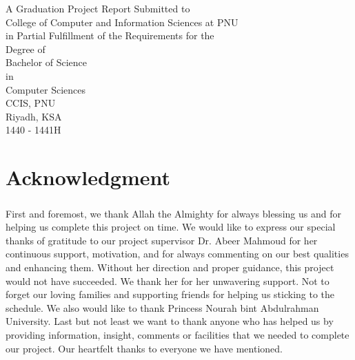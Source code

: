 \documentclass[12pt, oneside, a4paper]{book}
\begin{document}
\begin{titlepage}
\begin{center}
			\vfill \normalsize
			A Graduation Project Report Submitted to \\
			College of Computer and Information Sciences at PNU \\
			in Partial Fulfillment of the Requirements for the \\
			Degree of \\
			Bachelor of Science \\
			in \\
			Computer Sciences \\[5ex]
			CCIS, PNU \\
			Riyadh, KSA \\
			1440 - 1441H \\
		\end{center}
	\end{titlepage}
	\newpage

	\chapter*{Acknowledgment}
	\label{sec:ack}
	\paragraph{} First and foremost, we thank Allah the Almighty for always blessing us and for helping us complete this project on time. We would like to express our special thanks of gratitude to our project supervisor Dr. Abeer Mahmoud for her continuous support, motivation, and for always commenting on our best qualities and enhancing them. Without her direction and proper guidance, this project would not have succeeded. We thank her for her unwavering support. Not to forget our loving families and supporting friends for helping us sticking to the schedule. We also would like to thank Princess Nourah bint Abdulrahman University. Last but not least we want to thank anyone who has helped us by providing information, insight, comments or facilities that we needed to complete our project. Our heartfelt thanks to everyone we have mentioned.




	\tableofcontents
	\newpage	
	\doublespacing
	\newpage
	
	\listoftables
	\newpage
	
\end{document}

